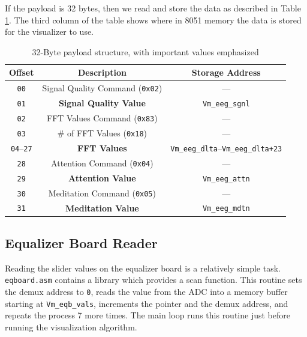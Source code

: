 \documentclass[letterpaper,10pt,notitlepage]{report}
\newcommand{\dat}[1]{\texttt{#1}}
\begin{document}
        If the payload is 32 bytes, then we read and store the data as
        described in Table \ref{tbl:payload}.  The third column of the table
        shows where in 8051 memory the data is stored for the visualizer to
        use.

        \begin{table}[h!]
            \caption{32-Byte payload structure, with important values emphasized}
            \label{tbl:payload}
            \begin{center}
                \begin{tabular}{c|c|c}
                    \hline
                    \hline
                    \textbf{Offset} & \textbf{Description} & \textbf{Storage Address} \\
                    \hline
                    \dat{00} & Signal Quality Command (\dat{0x02}) & --- \\
                    \dat{01} & \textbf{Signal Quality Value} & \dat{Vm\_eeg\_sgnl} \\
                    \dat{02} & FFT Values Command (\dat{0x83}) & --- \\
                    \dat{03} & \# of FFT Values (\dat{0x18}) & --- \\
                    \dat{04}--\dat{27} & \textbf{FFT Values} & 
                        \dat{Vm\_eeg\_dlta}--\dat{Vm\_eeg\_dlta+23} \\
                    \dat{28} & Attention Command (\dat{0x04}) & --- \\
                    \dat{29} & \textbf{Attention Value} &  \dat{Vm\_eeg\_attn} \\
                    \dat{30} & Meditation Command (\dat{0x05}) & --- \\
                    \dat{31} & \textbf{Meditation Value} & \dat{Vm\_eeg\_mdtn} \\
                    \hline
                    \hline
                \end{tabular}
            \end{center}
        \end{table}

    \subsection{Equalizer Board Reader}

        Reading the slider values on the equalizer board is a relatively simple
        task.  \dat{eqboard.asm} contains a library which provides a scan
        function.  This routine sets the demux address to \dat{0}, reads the
        value from the ADC into a memory buffer starting at
        \dat{Vm\_eqb\_vals}, increments the pointer and the demux address, and
        repeats the process 7 more times.  The main loop runs this routine just
        before running the visualization algorithm.
\end{document}
